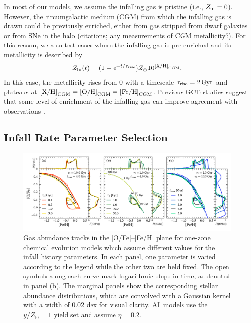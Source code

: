 \documentclass[twocolumn,twocolappendix,linenumbers]{aastex631}
\newcommand{\todo}[1]{{\color{red}#1}}
\newcommand{\mathXH}{{\rm [X/H]}}
\newcommand{\mathOH}{{\rm [O/H]}}
\newcommand{\mathFeH}{{\rm [Fe/H]}}
\newcommand{\mathOFe}{{\rm [O/Fe]}}
\newcommand{\yZ}[1]{$y/Z_\odot=#1$}
\begin{document}
In most of our models, we assume the infalling gas is pristine (i.e., $Z_{\rm in}=0$). However, the circumgalactic medium (CGM) from which the infalling gas is drawn could be previously enriched, either from gas stripped from dwarf galaxies or from SNe in the halo \todo{(citations; any measurements of CGM metallicity?)}. For this reason, we also test cases where the infalling gas is pre-enriched and its metallicity is described by
\begin{equation}
    \label{eq:pre-enrichment}
    Z_{\rm in}(t) = (1 - e^{-t/\tau_{\rm rise}}) Z_\odot 10^{\mathXH_{\rm CGM}}.
\end{equation}
In this case, the metallicity rises from 0 with a timescale $\tau_{\rm rise}=2\,{\rm Gyr}$ and plateaus at $\mathXH_{\rm CGM}=\mathOH_{\rm CGM}=\mathFeH_{\rm CGM}$. Previous GCE studies suggest that some level of enrichment of the infalling gas can improve agreement with observations \citep[e.g.,][]{palla_chemical_2020,johnson_milky_2024,spitoni_remind_2024}.

\subsection{Infall Rate Parameter Selection}
\label{sec:parameter-selection}

\begin{figure}
    \centering
    \includegraphics{figures/onezone_params.pdf}
    \caption{Gas abundance tracks in the [O/Fe]--[Fe/H] plane for one-zone chemical evolution models which assume different values for the infall history parameters. In each panel, one parameter is varied according to the legend while the other two are held fixed. The open symbols along each curve mark logarithmic steps in time, as denoted in panel (b). The marginal panels show the corresponding stellar abundance distributions, which are convolved with a Gaussian kernel with a width of 0.02 dex for visual clarity. All models use the \yZ{1} yield set and assume $\eta=0.2$.}
    \label{fig:twoinfall-parameters}
\end{figure}
\end{document}
